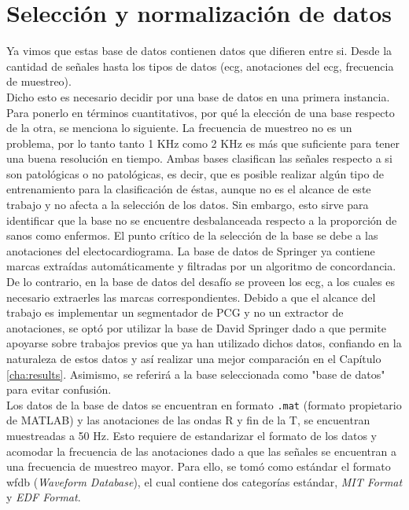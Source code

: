 \section{Selección y normalización de datos}

Ya vimos que estas base de datos contienen datos que difieren entre si. Desde la cantidad de señales hasta los tipos de datos (\acrshort{ecg}, anotaciones del \acrshort{ecg}, frecuencia de muestreo). \\
\indent Dicho esto es necesario decidir por una base de datos en una primera instancia. Para ponerlo en términos cuantitativos, por qué la elección de una base respecto de la otra, se menciona lo siguiente. La frecuencia de muestreo no es un problema, por lo tanto tanto 1 KHz como 2 KHz es más que suficiente para tener una buena resolución en tiempo. Ambas bases clasifican las señales respecto a si son patológicas o no patológicas, es decir, que es posible realizar algún tipo de entrenamiento para la clasificación de éstas, aunque no es el alcance de este trabajo y no afecta a la selección de los datos. Sin embargo, esto sirve para identificar que la base no se encuentre desbalanceada respecto a la proporción de sanos como enfermos. El punto crítico de la selección de la base se debe a las anotaciones del electocardiograma. La base de datos de Springer \cite{ref:logi-regression-springer} ya contiene marcas extraídas automáticamente y filtradas por un algoritmo de concordancia. De lo contrario, en la base de datos del desafío se proveen los \acrshort{ecg}, a los cuales es necesario extraerles las marcas correspondientes. Debido a que el alcance del trabajo es implementar un segmentador de PCG y no un extractor de anotaciones, se optó por utilizar la base de David Springer dado a que permite apoyarse sobre trabajos previos que ya han utilizado dichos datos, confiando en la naturaleza de estos datos y así realizar una mejor comparación en el Capítulo \ref{cha:results}. Asimismo, se referirá a la base seleccionada como "base de datos" para evitar confusión. \\
\indent Los datos de la base de datos se encuentran en formato \texttt{.mat} (formato propietario de \textsc{MATLAB\texttrademark}) y las anotaciones de las ondas R y fin de la T, se encuentran muestreadas a 50 Hz. Esto requiere de estandarizar el formato de los datos y acomodar la frecuencia de las anotaciones dado a que las señales se encuentran a una frecuencia de muestreo mayor. Para ello, se tomó como estándar el formato \acrshort{wfdb} (\textit{Waveform Database}), el cual contiene dos categorías estándar, \textit{MIT Format} y \textit{EDF Format}.

